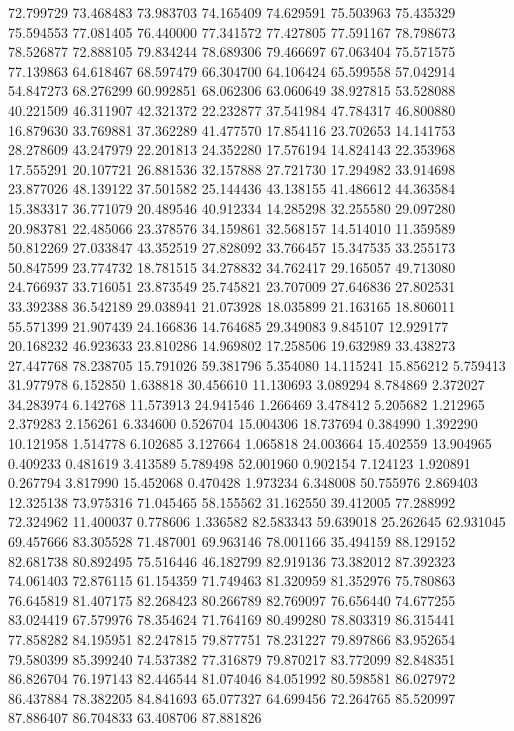 72.799729
73.468483
73.983703
74.165409
74.629591
75.503963
75.435329
75.594553
77.081405
76.440000
77.341572
77.427805
77.591167
78.798673
78.526877
72.888105
79.834244
78.689306
79.466697
67.063404
75.571575
77.139863
64.618467
68.597479
66.304700
64.106424
65.599558
57.042914
54.847273
68.276299
60.992851
68.062306
63.060649
38.927815
53.528088
40.221509
46.311907
42.321372
22.232877
37.541984
47.784317
46.800880
16.879630
33.769881
37.362289
41.477570
17.854116
23.702653
14.141753
28.278609
43.247979
22.201813
24.352280
17.576194
14.824143
22.353968
17.555291
20.107721
26.881536
32.157888
27.721730
17.294982
33.914698
23.877026
48.139122
37.501582
25.144436
43.138155
41.486612
44.363584
15.383317
36.771079
20.489546
40.912334
14.285298
32.255580
29.097280
20.983781
22.485066
23.378576
34.159861
32.568157
14.514010
11.359589
50.812269
27.033847
43.352519
27.828092
33.766457
15.347535
33.255173
50.847599
23.774732
18.781515
34.278832
34.762417
29.165057
49.713080
24.766937
33.716051
23.873549
25.745821
23.707009
27.646836
27.802531
33.392388
36.542189
29.038941
21.073928
18.035899
21.163165
18.806011
55.571399
21.907439
24.166836
14.764685
29.349083
9.845107
12.929177
20.168232
46.923633
23.810286
14.969802
17.258506
19.632989
33.438273
27.447768
78.238705
15.791026
59.381796
5.354080
14.115241
15.856212
5.759413
31.977978
6.152850
1.638818
30.456610
11.130693
3.089294
8.784869
2.372027
34.283974
6.142768
11.573913
24.941546
1.266469
3.478412
5.205682
1.212965
2.379283
2.156261
6.334600
0.526704
15.004306
18.737694
0.384990
1.392290
10.121958
1.514778
6.102685
3.127664
1.065818
24.003664
15.402559
13.904965
0.409233
0.481619
3.413589
5.789498
52.001960
0.902154
7.124123
1.920891
0.267794
3.817990
15.452068
0.470428
1.973234
6.348008
50.755976
2.869403
12.325138
73.975316
71.045465
58.155562
31.162550
39.412005
77.288992
72.324962
11.400037
0.778606
1.336582
82.583343
59.639018
25.262645
62.931045
69.457666
83.305528
71.487001
69.963146
78.001166
35.494159
88.129152
82.681738
80.892495
75.516446
46.182799
82.919136
73.382012
87.392323
74.061403
72.876115
61.154359
71.749463
81.320959
81.352976
75.780863
76.645819
81.407175
82.268423
80.266789
82.769097
76.656440
74.677255
83.024419
67.579976
78.354624
71.764169
80.499280
78.803319
86.315441
77.858282
84.195951
82.247815
79.877751
78.231227
79.897866
83.952654
79.580399
85.399240
74.537382
77.316879
79.870217
83.772099
82.848351
86.826704
76.197143
82.446544
81.074046
84.051992
80.598581
86.027972
86.437884
78.382205
84.841693
65.077327
64.699456
72.264765
85.520997
87.886407
86.704833
63.408706
87.881826
